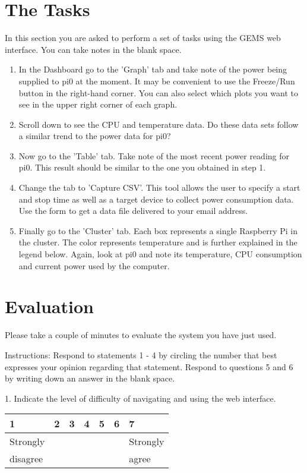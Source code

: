 \documentclass[12pt]{article}
\begin{document}
\section{The Tasks}
In this section you are asked to perform a set of tasks using the GEMS web interface. You can take notes in the blank space. 
\begin{enumerate}
  \item In the Dashboard go to the 'Graph' tab and take note of the power being supplied to pi0 at the moment. It may be convenient to use the Freeze/Run button in the right-hand corner. You can also select which plots you want to see in the upper right corner of each graph.\\
  \item Scroll down to see the CPU and temperature data. Do these data sets follow a similar trend to the power data for pi0?\\
  \item Now go to the 'Table' tab. Take note of the most recent power reading for pi0. This result should be similar to the one you obtained in step 1.\\
  \item Change the tab to 'Capture CSV'. This tool allows the user to specify a start and stop time as well as a target device to collect power consumption data. Use the form to get a data file delivered to your email address.\\
  \item Finally go to the 'Cluster' tab. Each box represents a single Raspberry Pi in the cluster. The color represents temperature and is further explained in the legend below. Again, look at pi0 and note its temperature, CPU consumption and current power used by the computer.
\end{enumerate}
\newpage
\section{Evaluation}
Please take a couple of minutes to evaluate the system you have just used.

Instructions: Respond to statements 1 - 4 by circling the number that best expresses your opinion regarding that statement. Respond to questions 5 and 6 by writing down an answer in the blank space.

1. Indicate the level of difficulty of navigating and using the web interface.
\vspace{-4ex}
\begin{center}
\begin{tabular}{
|m{4em}|m{4em}|m{4em}|m{4em}|m{4em}|m{4em}|m{4em}| }
\hline
 1 & 2 & 3 & 4 & 5 & 6 & 7 \\ 
 \hline
 Strongly &&&&&& Strongly\\
 disagree &&&&&& agree\\
  \hline
\end{tabular}
\end{center}
\end{document}

